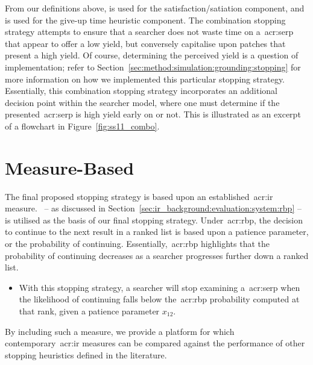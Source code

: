 From our definitions above,  is used for the satisfaction/satiation component, and  is used for the give-up time heuristic component. The combination stopping strategy attempts to ensure that a searcher does not waste time on a~\gls{acr:serp} that appear to offer a low yield, but conversely capitalise upon patches that present a high yield. Of course, determining the perceived yield is a question of implementation; refer to Section~\ref{sec:method:simulation:grounding:stopping} for more information on how we implemented this particular stopping strategy. Essentially, this combination stopping strategy incorporates an additional decision point within the searcher model, where one must determine if the presented~\gls{acr:serp} is high yield early on or not. This is illustrated as an excerpt of a flowchart in Figure~\ref{fig:ss11_combo}.

\section{Measure-Based}
The final proposed stopping strategy is based upon an established~\gls{acr:ir} measure.~ -- as discussed in Section~\ref{sec:ir_background:evaluation:system:rbp} -- is utilised as the basis of our final stopping strategy. Under~\gls{acr:rbp}, the decision to continue to the next result in a ranked list is based upon a patience parameter, or the probability of continuing. Essentially,~\gls{acr:rbp} highlights that the probability of continuing decreases as a searcher progresses further down a ranked list.

\begin{itemize}
    
    \item{ With this stopping strategy, a searcher will stop examining a~\gls{acr:serp} when the likelihood of continuing falls below the~\gls{acr:rbp} probability computed at that rank, given a patience parameter $x_{12}$.}
    
\end{itemize}

By including such a measure, we provide a platform for which contemporary~\gls{acr:ir} measures can be compared against the performance of other stopping heuristics defined in the literature.

